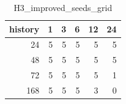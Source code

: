 \begin{table}
\caption{H3_improved_seeds_grid}
\label{tab:H3_improved_seeds_grid}
\begin{tabular}{rrrrrr}
\toprule
history & 1 & 3 & 6 & 12 & 24 \\
\midrule
24 & 5 & 5 & 5 & 5 & 5 \\
48 & 5 & 5 & 5 & 5 & 5 \\
72 & 5 & 5 & 5 & 5 & 1 \\
168 & 5 & 5 & 5 & 3 & 0 \\
\bottomrule
\end{tabular}
\end{table}
